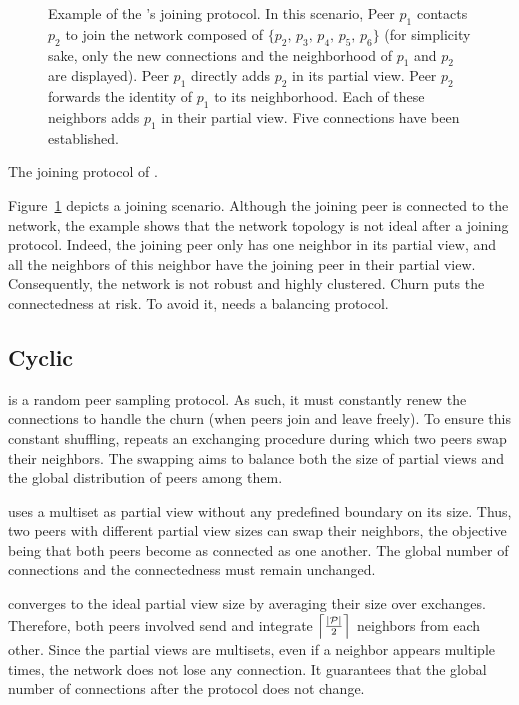 \begin{figure}
  \centering
  
  \caption{\label{fig:joiningexample}Example of the \SCAMPLON{}'s joining
    protocol. In this scenario, Peer $p_1$ contacts $p_2$ to join the network
    composed of $\{p_2,\,p_3,\,p_4,\,p_5,\,p_6\}$ (for simplicity sake, only
    the new connections and the neighborhood of $p_1$ and $p_2$ are
    displayed). Peer $p_1$ directly adds $p_2$ in its partial view. Peer $p_2$
    forwards the identity of $p_1$ to its neighborhood. Each of these
    neighbors adds $p_1$ in their partial view. Five connections have been
    established.}
\end{figure}

\begin{algorithm}

\caption{\label{algo:joiningalgo}The joining protocol of \SCAMPLON{}.}
\end{algorithm}

Figure~\ref{fig:joiningexample} depicts a joining scenario. Although the
joining peer is connected to the network, the example shows that the network
topology is not ideal after a joining protocol. Indeed, the joining peer only
has one neighbor in its partial view, and all the neighbors of this neighbor
have the joining peer in their partial view. Consequently, the network is not
robust and highly clustered. Churn puts the connectedness at risk. To avoid it,
\SCAMPLON{} needs a balancing protocol.

\subsection{Cyclic}
\label{subsec:cyclic}

\SCAMPLON{} is a random peer sampling protocol. As such, it must constantly
renew the connections to handle the churn (when peers join and leave freely).
To ensure this constant shuffling, \SCAMPLON{} repeats an exchanging procedure
during which two peers swap their neighbors. The swapping aims to balance both
the size of partial views and the global distribution of peers among them.

\SCAMPLON{} uses a multiset as partial view without any predefined boundary on
its size. Thus, two peers with different partial view sizes can swap their
neighbors, the objective being that both peers become as connected as one
another. The global number of connections and the connectedness must remain
unchanged.

\SCAMPLON{} converges to the ideal partial view size by averaging their size
over exchanges. Therefore, both peers involved send and integrate
$\left\lceil|\mathcal{P}|\over{2}\right\rceil$ neighbors from each
other. Since the partial views are multisets, even if a neighbor appears
multiple times, the network does not lose any connection. It guarantees that
the global number of connections after the protocol does not change.

